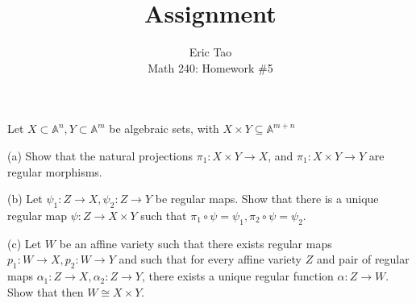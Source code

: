\documentclass[10pt]{article}
\newenvironment{problem}[2][Problem]{\begin{trivlist}
\item[\hskip \labelsep {\bfseries #1}\hskip \labelsep {\bfseries #2.}]}{\end{trivlist}}
\begin{document}
 
\title{Assignment}
\author{Eric Tao\\
Math 240: Homework \#5}
\maketitle
 
\begin{problem}{5.1}

Let $X \subset \mathbb{A}^n, Y \subset \mathbb{A}^m$ be algebraic sets, with $X \times Y \subseteq \mathbb{A}^{m+n}$

(a) Show that the natural projections $\pi_1: X \times Y \to X$, and  $\pi_1: X \times Y \to Y$ are regular morphisms.

(b) Let $\psi_1: Z \to X, \psi_2: Z \to Y$ be regular maps. Show that there is a unique regular map $\psi: Z \to X \times Y$ such that $\pi_1 \circ \psi = \psi_1, \pi_2 \circ \psi = \psi_2$.

(c) Let $W$ be an affine variety such that there exists regular maps $p_1: W \to X, p_2: W \to Y$ and such that for every affine variety $Z$ and pair of regular maps $\alpha_1: Z \to X, \alpha_2: Z \to Y$, there exists a unique regular function $\alpha: Z \to W$. Show that then $W \cong X \times Y$.

\end{problem}
\end{document}

